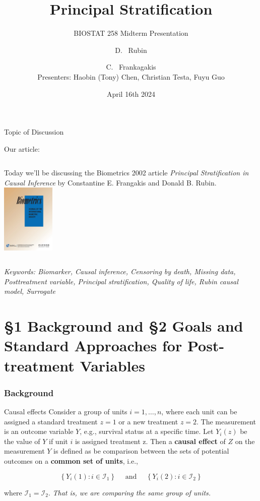 \documentclass[10pt]{beamer}
\title[Principal Stratification] %
{Principal Stratification}
\subtitle{BIOSTAT 258 Midterm Presentation}
\author[Chen, Testa, Guo] %
{D. ~Rubin \and C. ~Frankagakis \\
Presenters: Haobin (Tony) Chen, Christian Testa, Fuyu Guo}
\date{April 16th 2024}
\begin{document}
\frame{\titlepage}

\begin{frame}{Topic of Discussion}

  \begin{block}{Our article:}

    \begin{columns}[onlytextwidth,T]
      \column{\dimexpr\linewidth-30mm-5mm}
       \vspace{.25in}
        Today we'll be discussing the Biometrics 2002 article \textit{Principal Stratification in Causal Inference} 
        by Constantine E. Frangakis and Donald B. Rubin. 
      \column{28mm}
      \includegraphics[width=1in]{figures/biometrics.jpeg}

    \end{columns}
  \end{block}


{\footnotesize \textit{Keywords: Biomarker, Causal inference, Censoring by death, Missing data, Posttreatment variable, Principal stratification, Quality of life, Rubin causal model, Surrogate}}
\end{frame}


\section{\S 1 Background and \S 2 Goals and Standard Approaches for Post-treatment Variables}
\begin{frame}
\frametitle{Background}

\begin{block}{Causal effects}
Consider a group of units $i = 1, \ldots, n$, where each unit can be assigned a standard treatment $z=1$ or a new treatment $z=2$. The measurement is an outcome variable $Y$, e.g., survival status at a specific time. Let $Y_i(z)$ be the value of $Y$ if unit $i$ is assigned treatment z. Then a \textbf{causal effect} of $Z$ on the measurement $Y$ is defined as be comparison between the sets of potential outcomes on a \textbf{common set of units}, i.e.,

$$
\left\{Y_i(1): i \in \mathcal{I}_1\right\} \quad \text { and } \quad\left\{Y_i(2): i \in \mathcal{I}_2\right\}
$$

\noindent where $\mathcal{I}_1 = \mathcal{I}_2$. \textit{That is, we are comparing the same group of units.}
\end{block}
\end{frame}
\end{document}
